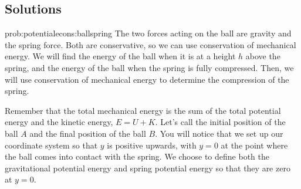 \subsection{Solutions}
\begin{solution}{prob:potentialecons:ballspring}\label{soln:potentialecons:ballspring}
The two forces acting on the ball are gravity and the spring force. Both are conservative, so we can use conservation of mechanical energy. We will find the energy of the ball when it is at a height $h$ above the spring, and the energy of the ball when the spring is fully compressed. Then, we will use conservation of mechanical energy to determine the compression of the spring.

Remember that the total mechanical energy is the sum of the total potential energy and the kinetic energy, $E=U+K$. Let's call the initial position of the ball $A$ and the final position of the ball $B$. You will notice that we set up our coordinate system so that $y$ is positive upwards, with $y=0$ at the point where the ball comes into contact with the spring. We choose to define both the gravitational potential energy and spring potential energy so that they are zero at $y=0$. 


\end{solution}
